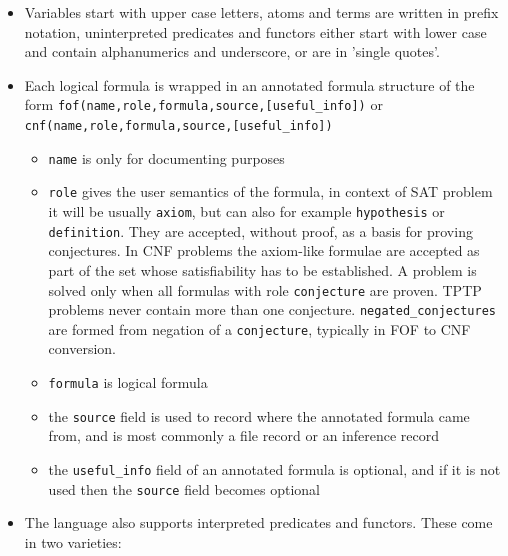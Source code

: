 \begin{itemize}
  \item Variables start with upper case letters, atoms and terms are written in prefix notation, uninterpreted predicates and functors either start with lower case and contain alphanumerics and underscore, or are in 'single quotes'.

  \item Each logical formula is wrapped in an annotated formula structure of the form \texttt{fof(name,role,formula,source,[useful_info])} or \texttt{cnf(name,role,formula,source,[useful_info])}

    \begin{itemize}
      \item \texttt{name} is only for documenting purposes
      \item \texttt{role} gives the user semantics of the formula, in context of SAT problem it will be usually \texttt{axiom}, but can also for example \texttt{hypothesis} or \texttt{definition}. They are accepted, without proof, as a basis for proving conjectures. In CNF problems the axiom-like formulae are accepted as part of the set whose satisfiability has to be established. A problem is solved only when all formulas with role \texttt{conjecture} are proven. TPTP problems never contain more than one conjecture. \texttt{negated_conjectures} are formed from negation of a \texttt{conjecture}, typically in FOF to CNF conversion.
      \item \texttt{formula} is logical formula
      \item the \texttt{source} field is used to record where the annotated formula came from, and is most commonly a file record or an inference record
      \item the \texttt{useful_info} field of an annotated formula is optional, and if it is not used then the \texttt{source} field becomes optional
    \end{itemize}

  \item The language also supports interpreted predicates and functors. These come in two varieties: 


\end{itemize}
